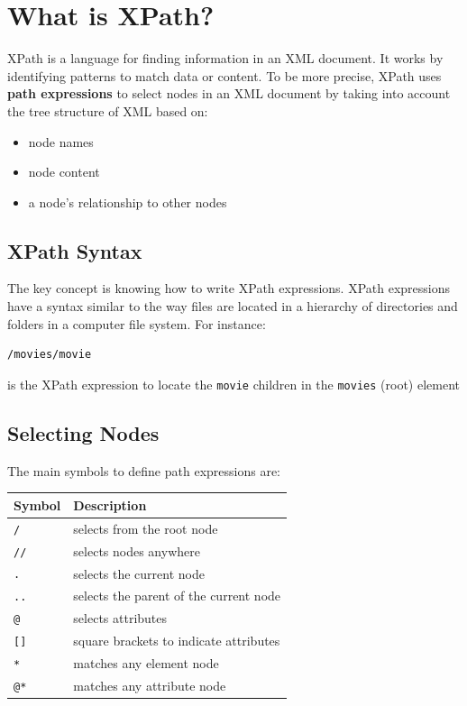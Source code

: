 \documentclass[
]{book}
\begin{document}
\hypertarget{what-is-xpath}{%
\section{What is XPath?}\label{what-is-xpath}}

XPath is a language for finding information in an XML document. It works by
identifying patterns to match data or content. To be more precise, XPath uses
\textbf{path expressions} to select nodes in an XML document by taking into account
the tree structure of XML based on:

\begin{itemize}
\item
  node names
\item
  node content
\item
  a node's relationship to other nodes
\end{itemize}

\hypertarget{xpath-syntax}{%
\subsection{XPath Syntax}\label{xpath-syntax}}

The key concept is knowing how to write XPath expressions. XPath expressions
have a syntax similar to the way files are located in a hierarchy of directories
and folders in a computer file system. For instance:

\begin{verbatim}
/movies/movie
\end{verbatim}

is the XPath expression to locate the \texttt{movie} children in the \texttt{movies} (root)
element

\hypertarget{selecting-nodes}{%
\subsection{Selecting Nodes}\label{selecting-nodes}}

The main symbols to define path expressions are:

\begin{longtable}[]{@{}ll@{}}
\toprule()
Symbol & Description \\
\midrule()
\endhead
\texttt{/} & selects from the root node \\
\texttt{//} & selects nodes anywhere \\
\texttt{.} & selects the current node \\
\texttt{..} & selects the parent of the current node \\
\texttt{@} & selects attributes \\
\texttt{{[}{]}} & square brackets to indicate attributes \\
\texttt{*} & matches any element node \\
\texttt{@*} & matches any attribute node \\
\bottomrule()
\end{longtable}
\end{document}
